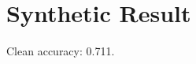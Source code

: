 \documentclass{article}
\begin{document}
\section{Synthetic Result}
Clean accuracy: 0.711.
\end{document}
